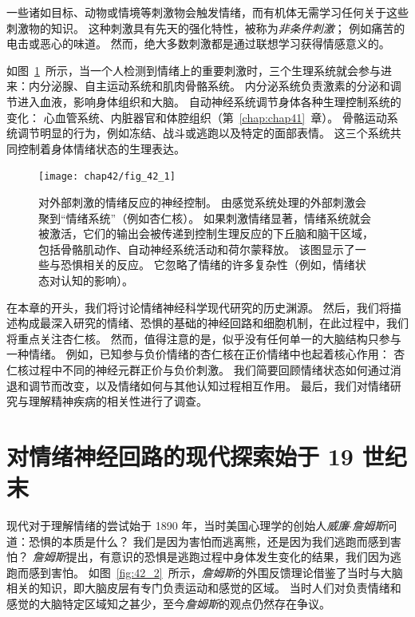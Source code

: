 一些诸如目标、动物或情境等刺激物会触发情绪，而有机体无需学习任何关于这些刺激物的知识。
这种刺激具有先天的强化特性，被称为\textit{非条件刺激}；
例如痛苦的电击或恶心的味道。
然而，绝大多数刺激都是通过联想学习获得情感意义的。


如图~\ref{fig:42_1}~所示，当一个人检测到情绪上的重要刺激时，三个生理系统就会参与进来：内分泌腺、自主运动系统和肌肉骨骼系统。
内分泌系统负责激素的分泌和调节进入血液，影响身体组织和大脑。
自动神经系统调节身体各种生理控制系统的变化：
心血管系统、内脏器官和体腔组织（第~\ref{chap:chap41}~章）。
骨骼运动系统调节明显的行为，例如冻结、战斗或逃跑以及特定的面部表情。
这三个系统共同控制着身体情绪状态的生理表达。


\begin{figure}[htbp]
	\centering
	\texttt{[image: chap42/fig\_42\_1]}
	\caption{对外部刺激的情绪反应的神经控制。
		由感觉系统处理的外部刺激会聚到“情绪系统”（例如杏仁核）。
		如果刺激情绪显著，情绪系统就会被激活，它们的输出会被传递到控制生理反应的下丘脑和脑干区域，包括骨骼肌动作、自动神经系统活动和荷尔蒙释放。
		该图显示了一些与恐惧相关的反应。
		它忽略了情绪的许多复杂性（例如，情绪状态对认知的影响）。}
	\label{fig:42_1}
\end{figure}


在本章的开头，我们将讨论情绪神经科学现代研究的历史渊源。
然后，我们将描述构成最深入研究的情绪、恐惧的基础的神经回路和细胞机制，在此过程中，我们将重点关注杏仁核。
然而，值得注意的是，似乎没有任何单一的大脑结构只参与一种情绪。
例如，已知参与负价情绪的杏仁核在正价情绪中也起着核心作用：
杏仁核过程中不同的神经元群正价与负价刺激。
我们简要回顾情绪状态如何通过消退和调节而改变，以及情绪如何与其他认知过程相互作用。
最后，我们对情绪研究与理解精神疾病的相关性进行了调查。



\section{对情绪神经回路的现代探索始于 19 世纪末}

现代对于理解情绪的尝试始于 1890 年，当时美国心理学的创始人\textit{威廉$\cdot$詹姆斯}问道：恐惧的本质是什么？
我们是因为害怕而逃离熊，还是因为我们逃跑而感到害怕？
\textit{詹姆斯}提出，有意识的恐惧是逃跑过程中身体发生变化的结果，我们因为逃跑而感到害怕。
如图~\ref{fig:42_2}~所示，\textit{詹姆斯}的外围反馈理论借鉴了当时与大脑相关的知识，即大脑皮层有专门负责运动和感觉的区域。
当时人们对负责情绪和感觉的大脑特定区域知之甚少，至今\textit{詹姆斯}的观点仍然存在争议。


